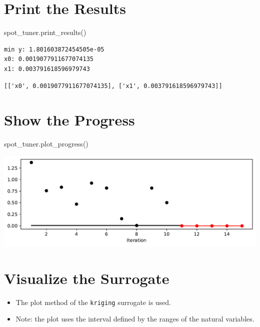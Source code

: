 \documentclass[
  letterpaper,
  DIV=11,
  numbers=noendperiod]{scrreprt}
\newenvironment{Shaded}{\begin{snugshade}}{\end{snugshade}}
\newcommand{\NormalTok}[1]{\textcolor[rgb]{0.00,0.23,0.31}{#1}}
\providecommand{\tightlist}{%
  \setlength{\itemsep}{0pt}\setlength{\parskip}{0pt}}\usepackage{longtable,booktabs,array}
\begin{document}
\section{Print the Results}\label{print-the-results-5}

\begin{Shaded}
\begin{Highlighting}[]
\NormalTok{spot\_tuner.print\_results()}
\end{Highlighting}
\end{Shaded}

\begin{verbatim}
min y: 1.801603872454505e-05
x0: 0.0019077911677074135
x1: 0.003791618596979743
\end{verbatim}

\begin{verbatim}
[['x0', 0.0019077911677074135], ['x1', 0.003791618596979743]]
\end{verbatim}

\section{Show the Progress}\label{show-the-progress-2}

\begin{Shaded}
\begin{Highlighting}[]
\NormalTok{spot\_tuner.plot\_progress()}
\end{Highlighting}
\end{Shaded}

\includegraphics{a_04_spot_doc_files/figure-pdf/cell-11-output-1.pdf}

\section{Visualize the Surrogate}\label{visualize-the-surrogate}

\begin{itemize}
\tightlist
\item
  The plot method of the \texttt{kriging} surrogate is used.
\item
  Note: the plot uses the interval defined by the ranges of the natural
  variables.
\end{itemize}
\end{document}

